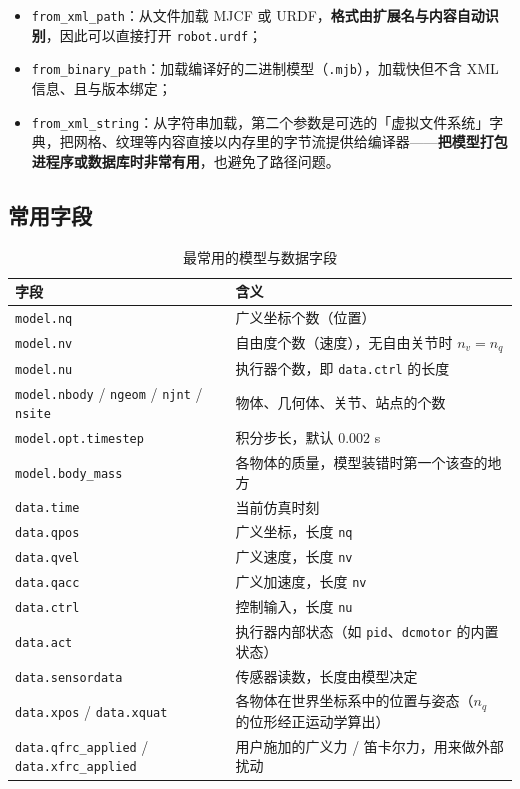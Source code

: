 \begin{itemize}
	\item \texttt{from\_xml\_path}：从文件加载 MJCF 或 URDF，\textbf{格式由扩展名与内容自动识别}，因此可以直接打开 \texttt{robot.urdf}；
	\item \texttt{from\_binary\_path}：加载编译好的二进制模型（\texttt{.mjb}），加载快但不含 XML 信息、且与版本绑定；
	\item \texttt{from\_xml\_string}：从字符串加载，第二个参数是可选的「虚拟文件系统」字典，把网格、纹理等内容直接以内存里的字节流提供给编译器——\textbf{把模型打包进程序或数据库时非常有用}，也避免了路径问题。
\end{itemize}

\subsection{常用字段}

\begin{table}[H]
	\centering
	\caption{最常用的模型与数据字段}
	\label{tab:Python:常用字段}
	\footnotesize
	\begin{tabular}{>{\raggedright\arraybackslash}p{4.6cm}>{\raggedright\arraybackslash}p{9.6cm}}
		\hline
		字段 & 含义 \\
		\hline
		\texttt{model.nq} & 广义坐标个数（位置） \\
		\texttt{model.nv} & 自由度个数（速度），无自由关节时 $n_{v}=n_{q}$ \\
		\texttt{model.nu} & 执行器个数，即 \texttt{data.ctrl} 的长度 \\
		\texttt{model.nbody} / \texttt{ngeom} / \texttt{njnt} / \texttt{nsite} & 物体、几何体、关节、站点的个数 \\
		\texttt{model.opt.timestep} & 积分步长，默认 $0.002$ s \\
		\texttt{model.body\_mass} & 各物体的质量，模型装错时第一个该查的地方 \\
		\texttt{data.time} & 当前仿真时刻 \\
		\texttt{data.qpos} & 广义坐标，长度 \texttt{nq} \\
		\texttt{data.qvel} & 广义速度，长度 \texttt{nv} \\
		\texttt{data.qacc} & 广义加速度，长度 \texttt{nv} \\
		\texttt{data.ctrl} & 控制输入，长度 \texttt{nu} \\
		\texttt{data.act} & 执行器内部状态（如 \texttt{pid}、\texttt{dcmotor} 的内置状态） \\
		\texttt{data.sensordata} & 传感器读数，长度由模型决定 \\
		\texttt{data.xpos} / \texttt{data.xquat} & 各物体在世界坐标系中的位置与姿态（$n_{q}$ 的位形经正运动学算出） \\
		\texttt{data.qfrc\_applied} / \texttt{data.xfrc\_applied} & 用户施加的广义力 / 笛卡尔力，用来做外部扰动 \\
		\hline
	\end{tabular}
\end{table}

